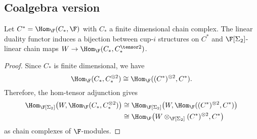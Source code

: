 
%

\subsection{Coalgebra version}

\begin{lemma} \label{lemma: cup-i constructions and diagonals are the same}
	Let $C^* = \Hom_{\F}(C_*, \F)$ with $C_*$ a finite dimensional chain complex. The linear duality functor induces a bijection between cup-$i$ structures on $C^*$ and $\F[\Sigma_2]$-linear chain maps $W \to \Hom_{\F}(C_*, C_*^{\tensor 2})$.
\end{lemma}

\begin{proof}
	Since $C_\ast$ is finite dimensional, we have
	\[
	\Hom_{\F}(C_\ast, C_\ast^{\otimes 2}) \cong \Hom_{\F}((C^\ast)^{\otimes 2}, C^\ast).
	\]
	Therefore, the hom-tensor adjunction gives
	\begin{align*}
	\Hom_{\F[\Sigma_2]}\big(W, \Hom_{\F}(C_\ast, C_\ast^{\otimes 2}) \big) & \cong
	\Hom_{\F[\Sigma_2]}\big(W, \Hom_{\F}((C^\ast)^{\otimes 2}, C^\ast) \big) \\ & \cong
	\Hom_{\F} \big(W \otimes_{\F[\Sigma_2]} (C^\ast)^{\otimes 2}, C^\ast \big)
	\end{align*}
	as chain complexes of $\F$-modules.
\end{proof}

